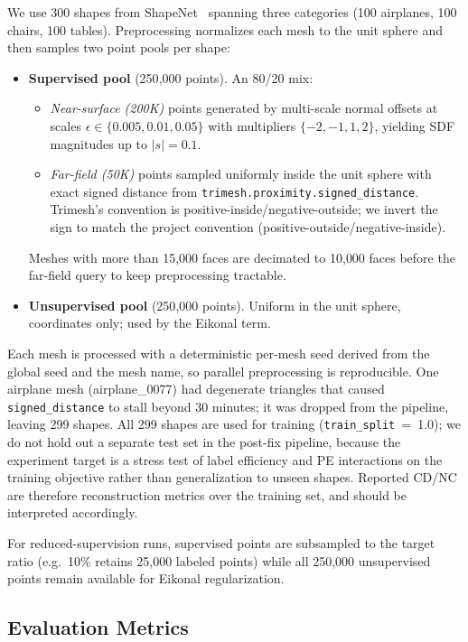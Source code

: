 \documentclass[conference]{IEEEtran}
\begin{document}
We use 300 shapes from ShapeNet~\cite{shapenet} spanning three categories (100 airplanes, 100 chairs, 100 tables). Preprocessing normalizes each mesh to the unit sphere and then samples two point pools per shape:
\begin{itemize}
    \item \textbf{Supervised pool} (250{,}000 points). An 80/20 mix:
    \begin{itemize}
        \item \emph{Near-surface (200K)} points generated by multi-scale normal offsets at scales $\epsilon \in \{0.005, 0.01, 0.05\}$ with multipliers $\{-2,-1,1,2\}$, yielding SDF magnitudes up to $|s|=0.1$.
        \item \emph{Far-field (50K)} points sampled uniformly inside the unit sphere with exact signed distance from \texttt{trimesh.proximity.signed\_distance}. Trimesh's convention is positive-inside/negative-outside; we invert the sign to match the project convention (positive-outside/negative-inside).
    \end{itemize}
    Meshes with more than 15{,}000 faces are decimated to 10{,}000 faces before the far-field query to keep preprocessing tractable.
    \item \textbf{Unsupervised pool} (250{,}000 points). Uniform in the unit sphere, coordinates only; used by the Eikonal term.
\end{itemize}
Each mesh is processed with a deterministic per-mesh seed derived from the global seed and the mesh name, so parallel preprocessing is reproducible. One airplane mesh (airplane\_0077) had degenerate triangles that caused \texttt{signed\_distance} to stall beyond 30 minutes; it was dropped from the pipeline, leaving 299 shapes. All 299 shapes are used for training (\texttt{train\_split}~=~1.0); we do not hold out a separate test set in the post-fix pipeline, because the experiment target is a stress test of label efficiency and PE interactions on the training objective rather than generalization to unseen shapes. Reported CD/NC are therefore reconstruction metrics over the training set, and should be interpreted accordingly.

For reduced-supervision runs, supervised points are subsampled to the target ratio (e.g.\ 10\% retains 25{,}000 labeled points) while all 250{,}000 unsupervised points remain available for Eikonal regularization.

\subsection{Evaluation Metrics}
\end{document}

